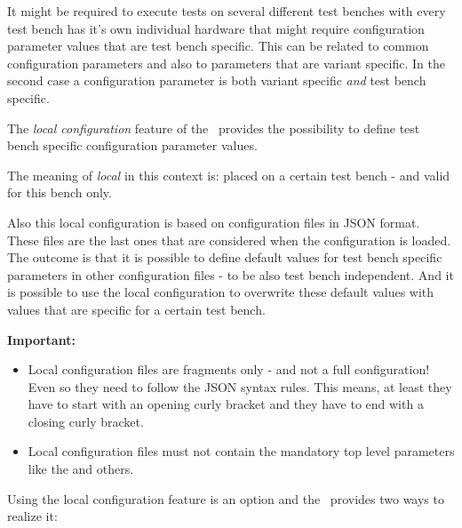 It might be required to execute tests on several different test benches with every test bench has it's own individual hardware
that might require configuration parameter values that are test bench specific. This can be related to common configuration parameters
and also to parameters that are variant specific. In the second case a configuration parameter is both variant specific \textit{and}
test bench specific.

The \textit{local configuration} feature of the \pkg\ provides the possibility to define test bench specific configuration parameter values.

The meaning of \textit{local} in this context is: placed on a certain test bench - and valid for this bench only.

Also this local configuration is based on configuration files in JSON format. These files are the last ones that are considered when the configuration is loaded.
The outcome is that it is possible to define default values for test bench specific parameters in other configuration files - to be also test bench independent.
And it is possible to use the local configuration to overwrite these default values with values that are specific for a certain test bench.

\textbf{Important:}

\begin{itemize}
   \item Local configuration files are fragments only - and not a full configuration! Even so they need to follow the JSON syntax rules.
         This means, at least they have to start with an opening curly bracket and they have to end with a closing curly bracket.
   \item Local configuration files must not contain the mandatory top level parameters like the  and others.
\end{itemize}

Using the local configuration feature is an option and the \pkg\ provides two ways to realize it:

